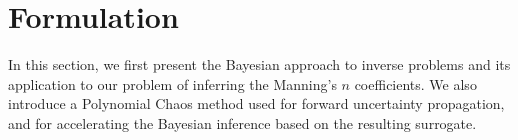 \section{Formulation}
\label{sec:formu}
In this section, we first present the Bayesian approach to inverse problems 
and its application to our problem of inferring the Manning's $n$ coefficients.
We also introduce
a Polynomial Chaos method used for forward uncertainty propagation, and 
for accelerating the Bayesian inference based on the resulting surrogate.






